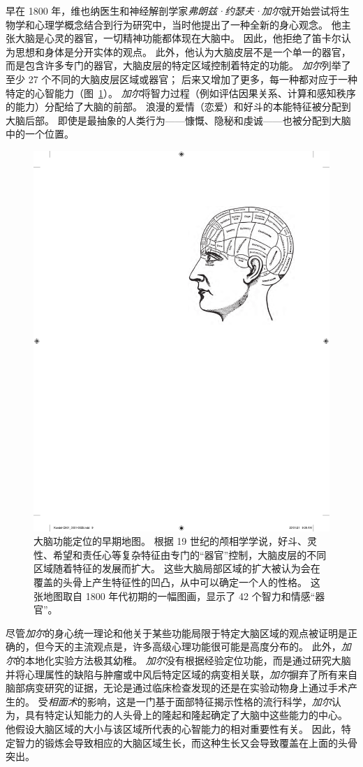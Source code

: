 早在 1800 年，维也纳医生和神经解剖学家\textit{弗朗兹·约瑟夫·加尔}就开始尝试将生物学和心理学概念结合到行为研究中，当时他提出了一种全新的身心观念。
他主张大脑是心灵的器官，一切精神功能都体现在大脑中。
因此，他拒绝了笛卡尔认为思想和身体是分开实体的观点。
此外，他认为大脑皮层不是一个单一的器官，而是包含许多专门的器官，大脑皮层的特定区域控制着特定的功能。 
\textit{加尔}列举了至少 27 个不同的大脑皮层区域或器官； 后来又增加了更多，每一种都对应于一种特定的心智能力（图~\ref{fig:1_1}）。
\textit{加尔}将智力过程（例如评估因果关系、计算和感知秩序的能力）分配给了大脑的前部。
浪漫的爱情（恋爱）和好斗的本能特征被分配到大脑后部。
即使是最抽象的人类行为——慷慨、隐秘和虔诚——也被分配到大脑中的一个位置。


\begin{figure}[htbp]
	\centering
	\includegraphics[width=0.5\linewidth]{chap01/fig_1_1}
	\caption{大脑功能定位的早期地图。
		根据 19 世纪的颅相学学说，好斗、灵性、希望和责任心等复杂特征由专门的“器官”控制，大脑皮层的不同区域随着特征的发展而扩大。
		这些大脑局部区域的扩大被认为会在覆盖的头骨上产生特征性的凹凸，从中可以确定一个人的性格。
		这张地图取自 1800 年代初期的一幅图画，显示了 42 个智力和情感“器官”。}
	\label{fig:1_1}
\end{figure}


尽管\textit{加尔}的身心统一理论和他关于某些功能局限于特定大脑区域的观点被证明是正确的，但今天的主流观点是，许多高级心理功能很可能是高度分布的。
此外，\textit{加尔}的本地化实验方法极其幼稚。
\textit{加尔}没有根据经验定位功能，而是通过研究大脑并将心理属性的缺陷与肿瘤或中风后特定区域的病变相关联，\textit{加尔}摒弃了所有来自脑部病变研究的证据，无论是通过临床检查发现的还是在实验动物身上通过手术产生的。
受\textit{相面术}的影响，这是一门基于面部特征揭示性格的流行科学，\textit{加尔}认为，具有特定认知能力的人头骨上的隆起和隆起确定了大脑中这些能力的中心。
他假设大脑区域的大小与该区域所代表的心智能力的相对重要性有关。
因此，特定智力的锻炼会导致相应的大脑区域生长，而这种生长又会导致覆盖在上面的头骨突出。


